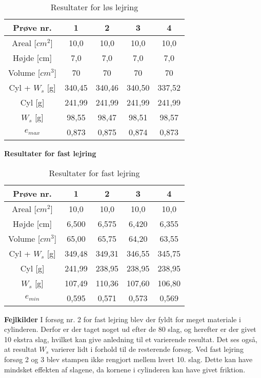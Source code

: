\begin{table} [H]
\begin{center}
	\begin{tabular}{ |c|c|c|c|c| } 
		\hline
		Prøve nr. & 1 & 2 & 3 & 4 \\	\hline 
		Areal [$cm^2$] & 10,0 & 10,0 & 10,0 & 10,0 \\ \hline
		Højde [cm] & 7,0 & 7,0 & 7,0 & 7,0 \\ \hline
		Volume [$cm^3$] & 70 & 70 & 70 & 70 \\ \hline
		Cyl + $W_s$ [g] & 340,45 & 340,46 & 340,50 & 337,52 \\ \hline
		Cyl [g] & 241,99 & 241,99 & 241,99 & 241,99 \\ \hline
		$W_s$ [g] & 98,55 & 98,47 & 98,51 & 98,57 \\ \hline
		$e_{max}$ & 0,873 & 0,875 & 0,874 & 0,873 \\ \hline
	\end{tabular}
	\caption{Resultater for løs lejring}
	\label{tab:bilagd1}
\end{center}
\end{table}

\textbf{Resultater for fast lejring}
\begin{table} [H]
\begin{center}
	\begin{tabular}{ |c|c|c|c|c| } 
		\hline
		Prøve nr. & 1 & 2 & 3 & 4 \\	\hline 
		Areal [$cm^2$] & 10,0 & 10,0 & 10,0 & 10,0 \\ \hline
		Højde [cm] & 6,500 & 6,575 & 6,420 & 6,355 \\ \hline
		Volume [$cm^3$] & 65,00 & 65,75 & 64,20 & 63,55 \\ \hline
		Cyl + $W_s$ [g] & 349,48 & 349,31 & 346,55 & 345,75 \\ \hline
		Cyl [g] & 241,99 & 238,95 & 238,95 & 238,95 \\ \hline
		$W_s$ [g] & 107,49 & 110,36 & 107,60 & 106,80 \\ \hline
		$e_{min}$ & 0,595 & 0,571 & 0,573 & 0,569 \\ \hline
	\end{tabular}
	\caption{Resultater for fast lejring}
	\label{tab:bilagd2}
\end{center}
\end{table}

\textbf{Fejlkilder}
\newline
I forsøg nr. 2 for fast lejring blev der fyldt for meget materiale i cylinderen. Derfor er der taget noget ud efter de 80 slag, og herefter er der givet 10 ekstra slag, hvilket kan give anledning til et varierende resultat. Det ses også, at resultat $W_s$ varierer lidt i forhold til de resterende forsøg.
\newline \indent{     }  Ved fast lejring forsøg 2 og 3 blev stampen ikke rengjort mellem hvert 10. slag. Dette kan have mindsket effekten af slagene, da kornene i cylinderen kan have givet friktion.